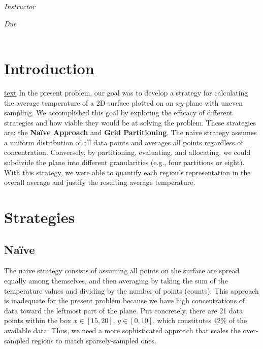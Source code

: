 \documentclass[12pt]{article}
\begin{document}
\begin{titlepage}
\begin{center}
\begin{large}
            \textit{Instructor} \\[1ex] %
            \professor

            \vspace*{1\baselineskip}

            \textit{Due}\\[1ex]
            {\scshape  \finaldate} \\[0.3\baselineskip] %

            \thispagestyle{empty}

        \end{large}
    \end{center}
\end{titlepage}

\section{Introduction}
\href{URL}{text}
In the present problem, our goal was to develop a strategy for calculating the average temperature of a 2D surface plotted on an \(xy\)-plane with uneven sampling. We accomplished this goal by exploring the efficacy of different strategies and how viable they would be at solving the problem. These strategies are: the \textbf{Naïve Approach} and \textbf{Grid Partitioning}. The naïve strategy assumes a uniform distribution of all data points and averages all points regardless of concentration. Conversely, by partitioning, evaluating, and allocating, we could subdivide the plane into different granularities (e.g., four partitions or eight). With this strategy, we were able to quantify each region's representation in the overall average and justify the resulting average temperature. 

\section{Strategies}

\subsection{Naïve}

The naïve strategy consists of assuming all points on the surface are spread equally among themselves, and then averaging by taking the sum of the temperature values and dividing by the number of points (counts). This approach is inadequate for the present problem because we have high concentrations of data toward the leftmost part of the plane. Put concretely, there are 21 data points within the box \(x \in [15, 20]\), \(y \in [0, 10]\), which constitutes 42\% of the available data. Thus, we need a more sophisticated approach that scales the over-sampled regions to match sparsely-sampled ones.
\end{document}
